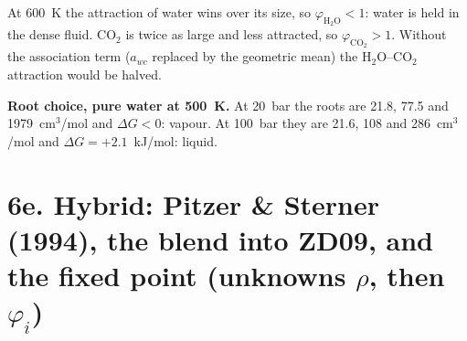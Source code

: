 \documentclass[11pt]{article}
\begin{document}
{\begin{minipage}[t]{0.37\linewidth}
\smallskip
At 600~K the attraction of water wins over its size, so $\varphi_{\mathrm{H_2O}}<1$: water is held in the dense fluid. CO$_2$ is twice as large and less attracted, so $\varphi_{\mathrm{CO_2}}>1$. Without the association term ($a_{wc}$ replaced by the geometric mean) the H$_2$O--CO$_2$ attraction would be halved.

\smallskip
\textbf{Root choice, pure water at 500~K.} At 20~bar the roots are 21.8, 77.5 and 1979~cm$^3$/mol and $\Delta G<0$: vapour. At 100~bar they are 21.6, 108 and 286~cm$^3$/mol and $\Delta G=+2.1$~kJ/mol: liquid.
\end{minipage}
}

\clearpage
\section*{6e. Hybrid: Pitzer \& Sterner (1994), the blend into ZD09, and the fixed point \quad (unknowns $\rho$, then $\varphi_i$)}
\end{document}

